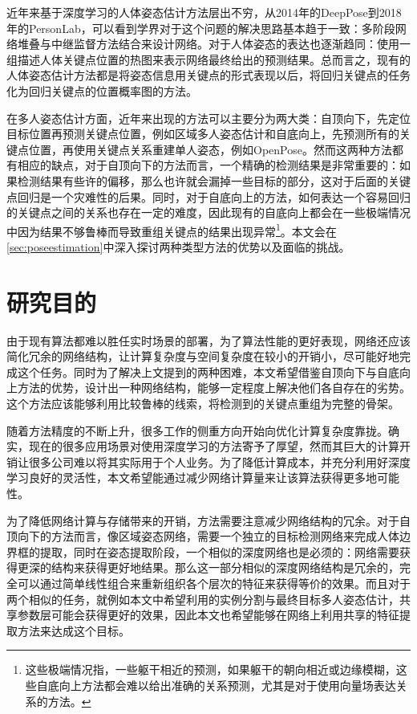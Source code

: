 近年来基于深度学习的人体姿态估计方法层出不穷，从2014年的DeepPose\cite{toshev2014deeppose}到2018年的PersonLab\cite{Papandreou2018PersonLab}，可以看到学界对于这个问题的解决思路基本趋于一致：多阶段网络堆叠与中继监督方法结合来设计网络。对于人体姿态的表达也逐渐趋同：使用一组描述人体关键点位置的热图来表示网络最终给出的预测结果。总而言之，现有的人体姿态估计方法都是将姿态信息用关键点的形式表现以后，将回归关键点的任务化为回归关键点的位置概率图的方法。

在多人姿态估计方面，近年来出现的方法可以主要分为两大类：自顶向下，先定位目标位置再预测关键点位置，例如区域多人姿态估计\cite{fang2017rmpe}和自底向上，先预测所有的关键点位置，再使用关键点关系重建单人姿态，例如OpenPose\cite{Cao2016Realtime}。然而这两种方法都有相应的缺点，对于自顶向下的方法而言，一个精确的检测结果是非常重要的：如果检测结果有些许的偏移，那么也许就会漏掉一些目标的部分，这对于后面的关键点回归是一个灾难性的后果。同时，对于自底向上的方法，如何表达一个容易回归的关键点之间的关系也存在一定的难度，因此现有的自底向上都会在一些极端情况中因为结果不够鲁棒而导致重组关键点的结果出现异常\footnote{这些极端情况指，一些躯干相近的预测，如果躯干的朝向相近或边缘模糊，这些自底向上方法都会难以给出准确的关系预测，尤其是对于使用向量场表达关系的方法。}。本文会在\ref{sec:poseestimation}中深入探讨两种类型方法的优势以及面临的挑战。

\section{研究目的}
\label{sec:generalmotivation}
由于现有算法都难以胜任实时场景的部署，为了算法性能的更好表现，网络还应该简化冗余的网络结构，让计算复杂度与空间复杂度在较小的开销小，尽可能好地完成这个任务。同时为了解决上文提到的两种困难，本文希望借鉴自顶向下与自底向上方法的优势，设计出一种网络结构，能够一定程度上解决他们各自存在的劣势。这个方法应该能够利用比较鲁棒的线索，将检测到的关键点重组为完整的骨架。

随着方法精度的不断上升，很多工作的侧重方向开始向优化计算复杂度靠拢。确实，现在的很多应用场景对使用深度学习的方法寄予了厚望，然而其巨大的计算开销让很多公司难以将其实际用于个人业务。为了降低计算成本，并充分利用好深度学习良好的灵活性，本文希望能通过减少网络计算量来让该算法获得更多地可能性。

为了降低网络计算与存储带来的开销，方法需要注意减少网络结构的冗余。对于自顶向下的方法而言，像区域姿态网络\cite{fang2017rmpe}，需要一个独立的目标检测网络来完成人体边界框的提取，同时在姿态提取阶段，一个相似的深度网络也是必须的：网络需要获得更深的结构来获得更好地结果。那么这一部分相似的深度网络结构是冗余的，完全可以通过简单线性组合来重新组织各个层次的特征来获得等价的效果。而且对于两个相似的任务，就例如本文中希望利用的实例分割与最终目标多人姿态估计，共享参数层可能会获得更好的效果，因此本文也希望能够在网络上利用共享的特征提取方法来达成这个目标。

